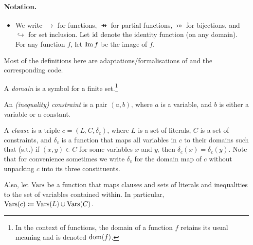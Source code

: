 \paragraph{Notation.}
\begin{itemize}
  \item We write $\to$ for functions, $\pfun$ for partial functions,
        $\twoheadrightarrowtail$ for bijections, and $\hookrightarrow$ for set
        inclusion. Let $\operatorname{id}$ denote the identity function (on any domain). For
        any function $f$, let $\operatorname{Im} f$ be the image of $f$.
\end{itemize}

Most of the definitions here are adaptations/formalisations of
\citep{DBLP:conf/ijcai/BroeckTMDR11} and the corresponding code.

\begin{definition}
  A \emph{domain} is a symbol for a finite set.\footnote{In the context of
    functions, the domain of a function $f$ retains its usual meaning and is
    denoted $\operatorname{dom}(f)$.}
\end{definition}

\begin{definition}
  An \emph{(inequality) constraint} is a pair $(a, b)$, where $a$ is a variable,
  and $b$ is either a variable or a constant.
\end{definition}


\begin{definition}
  A \emph{clause} is a triple $c = (L, C, \delta_c)$, where $L$ is a set of
  literals, $C$ is a set of constraints, and $\delta_c$ is a function that maps
  all variables in $c$ to their domains such that (s.t.) if $(x, y) \in C$ for
  some variables $x$ and $y$, then $\delta_c(x) = \delta_c(y)$. Note that for
  convenience sometimes we write $\delta_c$ for the domain map of $c$ without
  unpacking $c$ into its three constituents.

  Also, let $\operatorname{Vars}$ be a function that maps clauses and sets of literals and
  inequalities to the set of variables contained within. In particular,
  $\operatorname{Vars}(c) \coloneqq \operatorname{Vars}(L) \cup \operatorname{Vars}(C)$.
\end{definition}

